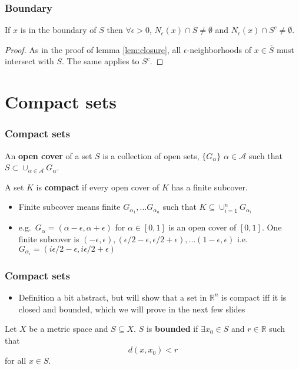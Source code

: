\documentclass[compress]{beamer}
\def\R{\mathbb{R}}
\begin{document}
\begin{frame}
  \frametitle{Boundary}
  \begin{lemma}
    If $x$ is in the boundary of $S$ then $\forall \epsilon>0$,
    $N_\epsilon(x) \cap S \neq \emptyset$ and $N_\epsilon(x) \cap S^c
    \neq \emptyset$. 
  \end{lemma}
  \begin{proof}
    As in the proof of lemma \ref{lem:closure}, all
    $\epsilon$-neighborhoods of $x \in \overline{S}$ must intersect with
    $S$. The same applies to $S^c$. 
  \end{proof}
\end{frame}

\section{Compact sets}

\begin{frame}
  \frametitle{Compact sets}
  \begin{definition}
    An \textbf{open cover} of a set $S$ is a collection of open sets,
    $\{G_\alpha\}$  $\alpha \in \mathcal{A}$ such that $S \subset
    \cup_{\alpha \in \mathcal{A}} G_\alpha$. 
  \end{definition}
  
  \begin{definition}
    A set $K$ is \textbf{compact} if every open cover of $K$ has a
    finite subcover. 
  \end{definition}
  \begin{itemize}
  \item Finite subcover means finite $G_{\alpha_1}, ... G_{\alpha_n}$
    such that $K \subseteq \cup_{i=1}^n G_{\alpha_i}$
  \item e.g.\ $G_{\alpha} = (\alpha-\epsilon,\alpha+\epsilon)$ for
    $\alpha \in [0,1]$ is an open cover of $[0,1]$. One finite subcover
    is $(-\epsilon,\epsilon),(\epsilon/2-\epsilon,\epsilon/2+\epsilon)
    , ... (1-\epsilon,\epsilon)$ i.e. $G_{\alpha_i} = (i\epsilon/2 -
    \epsilon, i\epsilon/2 + \epsilon)$
  \end{itemize}
\end{frame}

\begin{frame}
  \frametitle{Compact sets}
  \begin{itemize}
  \item Definition a bit abstract, but will show that a set in $\R^n$
    is compact iff it is closed and bounded, which we will prove in
    the next few slides 
  \end{itemize}
  \begin{definition}
    Let $X$ be a metric space and $S \subseteq X$. $S$ is
    \textbf{bounded} if $\exists x_0 \in S$ and $r \in \R$ such that 
    \[ d(x,x_0) < r \]
    for all $x \in S$.
  \end{definition}

\end{frame}
\end{document}

